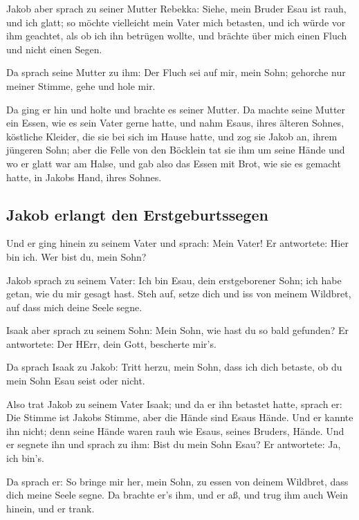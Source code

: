  Jakob aber sprach zu seiner Mutter Rebekka: Siehe, mein
Bruder Esau ist rauh, und ich glatt;  so möchte
vielleicht mein Vater mich betasten, und ich würde vor ihm geachtet, als
ob ich ihn betrügen wollte, und brächte über mich einen Fluch und nicht
einen Segen.

 Da sprach seine Mutter zu ihm: Der Fluch sei auf mir,
mein Sohn; gehorche nur meiner Stimme, gehe und hole mir.

 Da ging er hin und holte und brachte es seiner Mutter.
Da machte seine Mutter ein Essen, wie es sein Vater gerne hatte,
 und nahm Esaus, ihres älteren Sohnes, köstliche Kleider,
die sie bei sich im Hause hatte, und zog sie Jakob an, ihrem jüngeren
Sohn;  aber die Felle von den Böcklein tat sie ihm um
seine Hände und wo er glatt war am Halse,  und gab also
das Essen mit Brot, wie sie es gemacht hatte, in Jakobs Hand, ihres
Sohnes.

\hypertarget{jakob-erlangt-den-erstgeburtssegen}{%
\subsection{Jakob erlangt den
Erstgeburtssegen}\label{jakob-erlangt-den-erstgeburtssegen}}

 Und er ging hinein zu seinem Vater und sprach: Mein
Vater! Er antwortete: Hier bin ich. Wer bist du, mein Sohn?

 Jakob sprach zu seinem Vater: Ich bin Esau, dein
erstgeborener Sohn; ich habe getan, wie du mir gesagt hast. Steh auf,
setze dich und iss von meinem Wildbret, auf dass mich deine Seele segne.

 Isaak aber sprach zu seinem Sohn: Mein Sohn, wie hast du
so bald gefunden? Er antwortete: Der HErr, dein Gott, bescherte mir's.

 Da sprach Isaak zu Jakob: Tritt herzu, mein Sohn, dass
ich dich betaste, ob du mein Sohn Esau seist oder nicht.

 Also trat Jakob zu seinem Vater Isaak; und da er ihn
betastet hatte, sprach er: Die Stimme ist Jakobs Stimme, aber die Hände
sind Esaus Hände.  Und er kannte ihn nicht; denn seine
Hände waren rauh wie Esaus, seines Bruders, Hände. Und er segnete ihn
 und sprach zu ihm: Bist du mein Sohn Esau? Er
antwortete: Ja, ich bin's.

 Da sprach er: So bringe mir her, mein Sohn, zu essen von
deinem Wildbret, dass dich meine Seele segne. Da brachte er's ihm, und
er aß, und trug ihm auch Wein hinein, und er trank.

